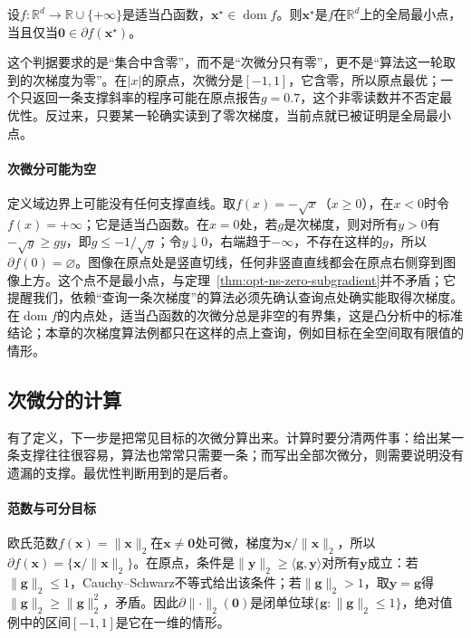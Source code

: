 \begin{theorem}[凸目标的最优条件]
\label{thm:opt-ns-zero-subgradient}
设$f:\mathbb R^d\to\mathbb R\cup\{+\infty\}$是适当凸函数，$\bm x^\star\in\operatorname{dom}f$。则$\bm x^\star$是$f$在$\mathbb R^d$上的全局最小点，当且仅当$\bm 0\in\partial f(\bm x^\star)$。
\end{theorem}

这个判据要求的是“集合中含零”，而不是“次微分只有零”，更不是“算法这一轮取到的次梯度为零”。在$|x|$的原点，次微分是$[-1,1]$，它含零，所以原点最优；一个只返回一条支撑斜率的程序可能在原点报告$g=0.7$，这个非零读数并不否定最优性。反过来，只要某一轮确实读到了零次梯度，当前点就已被证明是全局最小点。

\paragraph{次微分可能为空}
定义域边界上可能没有任何支撑直线。取$f(x)=-\sqrt x$（$x\geq0$），在$x<0$时令$f(x)=+\infty$；它是适当凸函数。在$x=0$处，若$g$是次梯度，则对所有$y>0$有$-\sqrt y\geq gy$，即$g\leq-1/\sqrt y$；令$y\downarrow0$，右端趋于$-\infty$，不存在这样的$g$，所以$\partial f(0)=\varnothing$。图像在原点处是竖直切线，任何非竖直直线都会在原点右侧穿到图像上方。这个点不是最小点，与定理~\ref{thm:opt-ns-zero-subgradient}并不矛盾；它提醒我们，依赖“查询一条次梯度”的算法必须先确认查询点处确实能取得次梯度。在$\operatorname{dom}f$的内点处，适当凸函数的次微分总是非空的有界集，这是凸分析中的标准结论；本章的次梯度算法例都只在这样的点上查询，例如目标在全空间取有限值的情形。

\subsection{次微分的计算}
\label{sec:opt-ns-subdifferential-calculus}

有了定义，下一步是把常见目标的次微分算出来。计算时要分清两件事：给出某一条支撑往往很容易，算法也常常只需要一条；而写出全部次微分，则需要说明没有遗漏的支撑。最优性判断用到的是后者。

\paragraph{范数与可分目标}
欧氏范数$f(\bm x)=\lVert\bm x\rVert_2$在$\bm x\neq\bm 0$处可微，梯度为$\bm x/\lVert\bm x\rVert_2$，所以$\partial f(\bm x)=\{\bm x/\lVert\bm x\rVert_2\}$。在原点，条件是$\lVert\bm y\rVert_2\geq\langle\bm g,\bm y\rangle$对所有$\bm y$成立：若$\lVert\bm g\rVert_2\leq1$，Cauchy--Schwarz不等式给出该条件；若$\lVert\bm g\rVert_2>1$，取$\bm y=\bm g$得$\lVert\bm g\rVert_2\geq\lVert\bm g\rVert_2^2$，矛盾。因此$\partial\lVert\cdot\rVert_2(\bm 0)$是闭单位球$\{\bm g:\lVert\bm g\rVert_2\leq1\}$，绝对值例中的区间$[-1,1]$是它在一维的情形。

